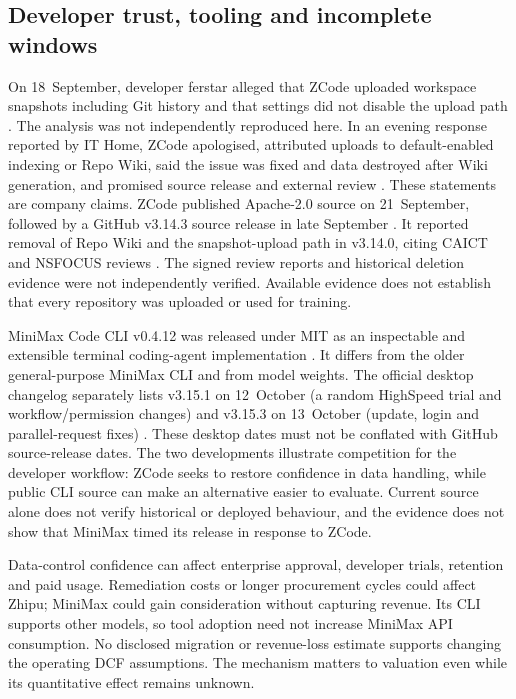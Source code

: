 \documentclass[11pt]{article}
\begin{document}
\subsection{Developer trust, tooling and incomplete windows}
On 18~September, developer ferstar alleged that ZCode uploaded workspace snapshots including Git history and that settings did not disable the upload path \citep{zcodeanalysis2026}. The analysis was not independently reproduced here. In an evening response reported by IT Home, ZCode apologised, attributed uploads to default-enabled indexing or Repo Wiki, said the issue was fixed and data destroyed after Wiki generation, and promised source release and external review \citep{zcoderesponse2026}. These statements are company claims. ZCode published Apache-2.0 source on 21~September, followed by a GitHub v3.14.3 source release in late September \citep{zcodeopen2026}. It reported removal of Repo Wiki and the snapshot-upload path in v3.14.0, citing CAICT and NSFOCUS reviews \citep{zcodereview2026}. The signed review reports and historical deletion evidence were not independently verified. Available evidence does not establish that every repository was uploaded or used for training.

MiniMax Code CLI v0.4.12 was released under MIT as an inspectable and extensible terminal coding-agent implementation \citep{minimaxcode2026}. It differs from the older general-purpose MiniMax CLI and from model weights. The official desktop changelog separately lists v3.15.1 on 12~October (a random HighSpeed trial and workflow/permission changes) and v3.15.3 on 13~October (update, login and parallel-request fixes) \citep{zcodeoct2026}. These desktop dates must not be conflated with GitHub source-release dates. The two developments illustrate competition for the developer workflow: ZCode seeks to restore confidence in data handling, while public CLI source can make an alternative easier to evaluate. Current source alone does not verify historical or deployed behaviour, and the evidence does not show that MiniMax timed its release in response to ZCode.

Data-control confidence can affect enterprise approval, developer trials, retention and paid usage. Remediation costs or longer procurement cycles could affect Zhipu; MiniMax could gain consideration without capturing revenue. Its CLI supports other models, so tool adoption need not increase MiniMax API consumption. No disclosed migration or revenue-loss estimate supports changing the operating DCF assumptions. The mechanism matters to valuation even while its quantitative effect remains unknown.
\end{document}
